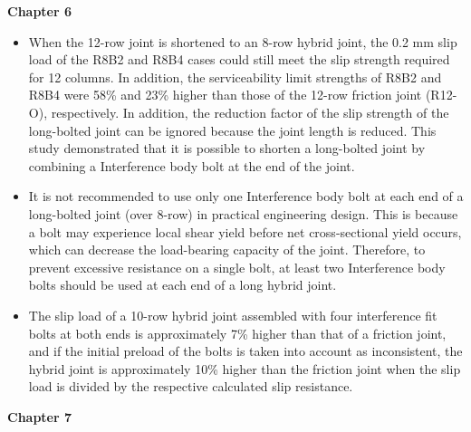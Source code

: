 \textbf{Chapter 6}

\begin{itemize}

\item When the 12-row joint is shortened to an 8-row hybrid joint, the 0.2 mm slip load of the R8B2 and R8B4 cases could still meet the slip strength required for 12 columns. In addition, the serviceability limit strengths of R8B2 and R8B4 were 58\% and 23\% higher than those of the 12-row friction joint (R12-O), respectively. In addition, the reduction factor of the slip strength of the long-bolted joint can be ignored because the joint length is reduced. This study demonstrated that it is possible to shorten a long-bolted joint by combining a Interference body bolt at the end of the joint. 

\item It is not recommended to use only one Interference body bolt at each end of a long-bolted joint (over 8-row) in practical engineering design. This is because a bolt may experience local shear yield before net cross-sectional yield occurs, which can decrease the load-bearing capacity of the joint. Therefore, to prevent excessive resistance on a single bolt, at least two Interference body bolts should be used at each end of a long hybrid joint.

\item The slip load of a 10-row hybrid joint assembled with four interference fit bolts at both ends is approximately 7\% higher than that of a friction joint, and if the initial preload of the bolts is taken into account as inconsistent, the hybrid joint is approximately 10\% higher than the friction joint when the slip load is divided by the respective calculated slip resistance.

\end{itemize}

\textbf{Chapter 7}

